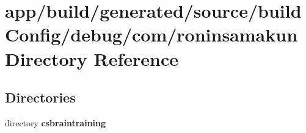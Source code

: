 \section{app/build/generated/source/build\+Config/debug/com/roninsamakun Directory Reference}
\label{dir_40f6f9ebafedaf1bc7d7bb38c8f3ad01}
\subsection*{Directories}
\begin{DoxyCompactItemize}
\item 
directory {\bf csbraintraining}
\end{DoxyCompactItemize}
